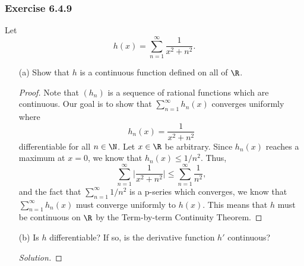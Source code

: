 \subsubsection{Exercise 6.4.9} Let 
\[  h(x) = \sum_{ n=1 }^{ \infty  } \frac{ 1 }{ x^2 +n^2  }. \]
\begin{enumerate}
    \item[(a)] Show that \( h  \) is a continuous function defined on all of \( \R  \).
        \begin{proof}
        Note that \( (h_n)  \) is a sequence of rational functions which are continuous. Our goal is to show that \( \sum_{ n=1 }^{ \infty  } h_n(x)  \) converges uniformly where 
        \[  h_n(x) = \frac{ 1 }{ x^2 + n^2  }\] differentiable for all \(  n \in \N  \).  Let \( x \in \R  \) be arbitrary. Since \( h_n(x)  \) reaches a maximum at \( x = 0  \), we know that \( h_n(x) \leq 1 / n^2  \). Thus,
        \[  \sum_{ n=1 }^{ \infty  } \Big| \frac{ 1 }{ x^2 + n^2 } \Big|  \leq \sum_{ n=1 }^{ \infty  } \frac{ 1 }{ n^2  },   \]
        and the fact that \( \sum_{ n=1 }^{ \infty  } 1 / n^{2} \) is a p-series which converges, we know that \( \sum_{ n=1 }^{ \infty  } h_n(x)   \) must converge uniformly to \( h(x)  \). This means that \( h  \) must be continuous on \( \R  \) by the Term-by-term Continuity Theorem.
        \end{proof}
    \item[(b)] Is \( h  \) differentiable? If so, is the derivative function \( h' \) continuous? 
        \begin{proof}[Solution]
        
        \end{proof}
\end{enumerate}




